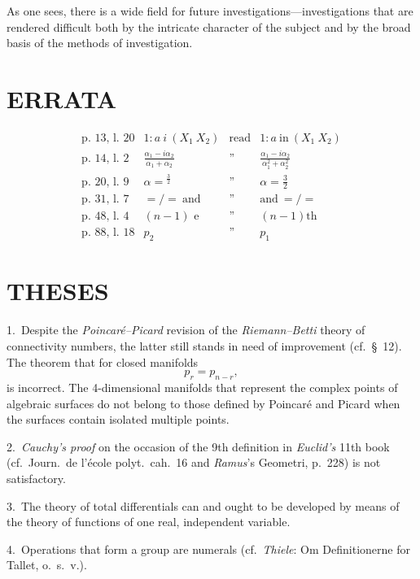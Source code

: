 \documentclass{article}
\begin{document}
As one sees, there is a wide field for future investigations---investigations that are rendered difficult both by the intricate character of the subject and by the broad basis of the methods of investigation.

\section*{ERRATA}

\[
\begin{array}{llll}
\text{p.\ 13, l.\ 20} & 1 : a\ i\ (X_1\ X_2) & \text{read} & 1 : a\ \text{in}\ (X_1\ X_2) \\[6pt]
\text{p.\ 14, l.\ 2}  & \frac{\alpha_1 - i\alpha_2}{\alpha_1 + \alpha_2} & \text{''} & \frac{\alpha_1 - i\alpha_2}{\alpha_1^2 + \alpha_2^2} \\[12pt]
\text{p.\ 20, l.\ 9}  & \alpha = {}^{\frac{3}{2}} & \text{''} & \alpha = \frac{3}{2} \\[6pt]
\text{p.\ 31, l.\ 7}  & =/\!=\ \text{and} & \text{''} & \text{and}\ =/\!= \\[6pt]
\text{p.\ 48, l.\ 4}  & (n-1)\text{ e} & \text{''} & (n-1)\text{th} \\[6pt]
\text{p.\ 88, l.\ 18} & p_2 & \text{''} & p_1
\end{array}
\]

\section*{THESES}

1.~Despite the \emph{Poincaré--Picard} revision of the \emph{Riemann--Betti} theory of connectivity numbers, the latter still stands in need of improvement (cf.\ \S~12). The theorem that for closed manifolds
\[
p_r = p_{n-r},
\]
is incorrect. The 4-dimensional manifolds that represent the complex points of algebraic surfaces do not belong to those defined by Poincaré and Picard when the surfaces contain isolated multiple points.

2.~\emph{Cauchy's proof} on the occasion of the 9th definition in \emph{Euclid's} 11th book (cf.\ Journ.\ de l'école polyt.\ cah.\ 16 and \emph{Ramus}'s Geometri, p.\ 228) is not satisfactory.

3.~The theory of total differentials can and ought to be developed by means of the theory of functions of one real, independent variable.

4.~Operations that form a group are numerals (cf.\ \emph{Thiele}: Om Definitionerne for Tallet, o.\ s.\ v.).
\end{document}
